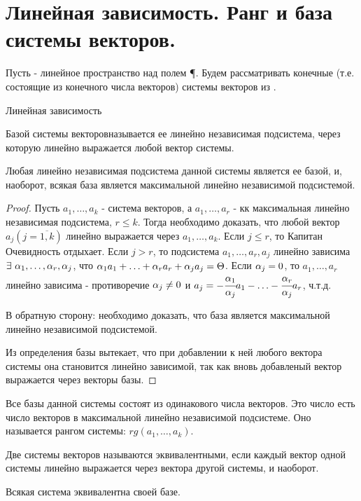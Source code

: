 \section{Линейная зависимость. Ранг и база системы векторов.}
Пусть \V - линейное пространство над полем \P. Будем рассматривать конечные (т.е. состоящие из конечного числа векторов) системы векторов из \V.
\begin{opred}Линейная зависимость\end{opred}
\begin{opred}
Базой системы векторовназывается ее линейно независимая подсистема, через которую линейно выражается любой вектор системы.
\end{opred}
\begin{theor}
Любая линейно независимая подсистема данной системы является ее базой, и, наоборот, всякая база является максимальной линейно независимой подсистемой.
\end{theor}
\begin{proof}
Пусть $a_1,\ldots,a_k$ - система векторов, а $a_1,\ldots,a_r$ - кк максимальная линейно независимая подсистема, $r\leq k$. Тогда необходимо доказать, что любой вектор $a_j(j=\overline{1,k})$ линейно выражается через $a_1,\ldots,a_k$. Если $j\leq r$, то Капитан Очевидность отдыхает. Если $j>r$, то подсистема $a_1,\ldots,a_r,a_j$ линейно зависима \then $\exists\ \a_1,\ldots,\a_r,\a_j$, что $\alpha_1a_1+\ldots+\alpha_ra_r+\alpha_ja_j=\Theta$. Если $\alpha_j=0$, то $a_1,\ldots,a_r$ линейно зависима - противоречие \then $\alpha_j\neq0$ и $a_j=-\cfrac{\alpha_1}{\alpha_j}a_1-\ldots-\cfrac{\alpha_r}{\alpha_j}a_r$, ч.т.д.

В обратную сторону: необходимо доказать, что база является максимальной линейно независимой подсистемой.

Из определения базы вытекает, что при добавлении к ней любого вектора системы она становится линейно зависимой, так как вновь добавленый вектор выражается через векторы базы.
\end{proof}
\begin{effect}
Все базы данной системы состоят из одинакового числа векторов. Это число есть число векторов в максимальной линейно независимой подсистеме. Оно называется рангом системы: $rg(a_1,\ldots,a_k)$.
\end{effect}
\begin{opred}
Две системы векторов называются эквивалентными, если каждый вектор одной системы линейно выражается через вектора другой системы, и наоборот.
\end{opred}
\begin{effect}
Всякая система эквивалентна своей базе.
\end{effect}
